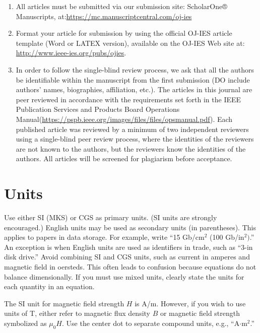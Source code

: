 \documentclass{ieeeojies}
\begin{document}
\begin{enumerate}
\item All articles must be submitted via our submission site: ScholarOne® Manuscripts, at:\break \underline{https://mc.manuscriptcentral.com/oj-ies}

\item Format your article for submission by using the official OJ-IES article template (Word or LATEX version), available on the OJ-IES Web site at: \break\underline{http://www.ieee-ies.org/pubs/ojies}.

\item In order to follow the single-blind review process, we ask that all the authors be identifiable within the manuscript from the first submission (DO include authors’ names, biographies, affiliation, etc.). The articles in this journal are peer reviewed in accordance with the requirements set forth in the IEEE Publication Services and Products Board Operations Manual\break(\underline{https://pspb.ieee.org/images/files/files/opsmanual.pdf}). Each published article was reviewed by a minimum of two independent reviewers using a single-blind peer review process, where the identities of the reviewers are not known to the authors, but the reviewers know the identities of the authors. All articles will be screened for plagiarism before acceptance.

\end{enumerate}

\section{Units}
Use either SI (MKS) or CGS as primary units. (SI units are strongly
encouraged.) English units may be used as secondary units (in parentheses).
This applies to papers in data storage. For example, write ``15
Gb/cm$^{2}$ (100 Gb/in$^{2})$.'' An exception is when
English units are used as identifiers in trade, such as ``3\textonehalf-in
disk drive.'' Avoid combining SI and CGS units, such as current in amperes
and magnetic field in oersteds. This often leads to confusion because
equations do not balance dimensionally. If you must use mixed units, clearly
state the units for each quantity in an equation.

The SI unit for magnetic field strength $H$ is A/m. However, if you wish to use
units of T, either refer to magnetic flux density $B$ or magnetic field
strength symbolized as $\mu _{0}H$. Use the center dot to separate
compound units, e.g., ``A$\cdot $m$^{2}$.''
\end{document}
